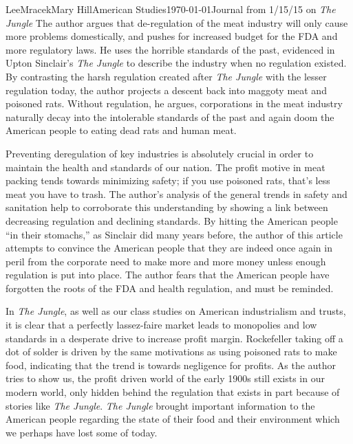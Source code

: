 \documentclass[11pt, letterpaper]{article}
\begin{document}
\begin{mla}{Lee}{Mracek}{Mary Hill}{American Studies}{\today}{Journal from 1/15/15 on \textit{The Jungle}}
    The author argues that de-regulation of the meat industry will only cause more problems domestically, and pushes for increased budget for the FDA and more regulatory laws. He uses the horrible standards of the past, evidenced in Upton Sinclair's \textit{The Jungle} to describe the industry when no regulation existed. By contrasting the harsh regulation created after \textit{The Jungle} with the lesser regulation today, the author projects a descent back into maggoty meat and poisoned rats. Without regulation, he argues, corporations in the meat industry naturally decay into the intolerable standards of the past and again doom the American people to eating dead rats and human meat.

    Preventing deregulation of key industries is absolutely crucial in order to maintain the health and standards of our nation. The profit motive in meat packing tends towards minimizing safety; if you use poisoned rats, that's less meat you have to trash. The author's analysis of the general trends in safety and sanitation help to corroborate this understanding by showing a link between decreasing regulation and declining standards. By hitting the American people ``in their stomachs,'' as Sinclair did many years before, the author of this article attempts to convince the American people that they are indeed once again in peril from the corporate need to make more and more money unless enough regulation is put into place. The author fears that the American people have forgotten the roots of the FDA and health regulation, and must be reminded.

    In \textit{The Jungle}, as well as our class studies on American industrialism and trusts, it is clear that a perfectly lassez-faire market leads to monopolies and low standards in a desperate drive to increase profit margin. Rockefeller taking off a dot of solder is driven by the same motivations as using poisoned rats to make food, indicating that the trend is towards negligence for profits. As the author tries to show us, the profit driven world of the early 1900s still exists in our modern world, only hidden behind the regulation that exists in part because of stories like \textit{The Jungle}. \textit{The Jungle} brought important information to the American people regarding the state of their food and their environment which we perhaps have lost some of today.
\end{mla}
\end{document}
